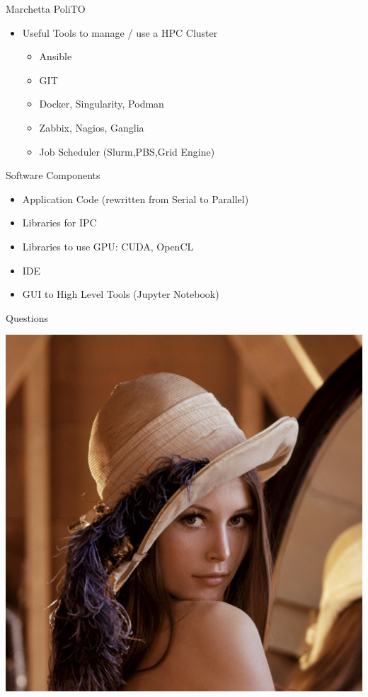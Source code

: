 \documentclass[ignorenonframetext,]{beamer}
\providecommand{\tightlist}{%
  \setlength{\itemsep}{0pt}\setlength{\parskip}{0pt}}
\begin{document}
\begin{frame}{Marchetta PoliTO}

\begin{itemize}
\tightlist
\item
  Useful Tools to manage / use a HPC Cluster

  \begin{itemize}
  \tightlist
  \item
    Ansible
  \item
    GIT
  \item
    Docker, Singularity, Podman
  \item
    Zabbix, Nagios, Ganglia
  \item
    Job Scheduler (Slurm,PBS,Grid Engine)
  \end{itemize}

\end{itemize}


\end{frame}

\begin{frame}{Software Components}

\begin{itemize}
\tightlist
\item
  Application Code (rewritten from Serial to Parallel)
\item
  Libraries for IPC
\item
  Libraries to use GPU: CUDA, OpenCL
\item
  IDE
\item
  GUI to High Level Tools (Jupyter Notebook)
\end{itemize}


\end{frame}

\begin{frame}{Questions}

\includegraphics{images/Lenna-Q1.png}

\end{frame}
\end{document}
